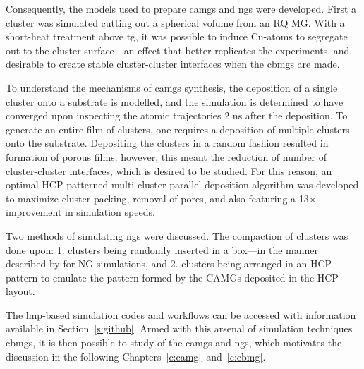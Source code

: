 Consequently, the models used to prepare \gls{camg}s and \gls{ng}s were developed. First a cluster was simulated cutting out a spherical volume from an RQ MG. With a short-heat treatment above \gls{tg}, it was possible to induce Cu-atoms to segregate out to the cluster surface---an effect that better replicates the experiments, and desirable to create stable cluster-cluster interfaces when the \gls{cbmg}s are made. \par

To understand the mechanisms of \gls{camg}s synthesis, the deposition of a single cluster onto a substrate is modelled, and the simulation is determined to have converged upon inspecting the atomic trajectories 2 ns after the deposition. To generate an entire film of clusters, one requires a deposition of multiple clusters onto the substrate. Depositing the clusters in a random fashion resulted in formation of porous films: however, this meant the reduction of number of cluster-cluster interfaces, which is desired to be studied. For this reason, an optimal HCP patterned multi-cluster parallel deposition algorithm was developed to maximize cluster-packing, removal of pores, and also featuring a 13$\times$ improvement in simulation speeds. \par

Two methods of simulating \gls{ng}s were discussed. The compaction of clusters was done upon: 1. clusters being randomly inserted in a box---in the manner described by \textcite{Adjaoud2018} for NG simulations, and 2. clusters being arranged in an HCP pattern to emulate the pattern formed by the CAMGs deposited in the HCP layout. \par

The \gls{lmp}-based simulation codes and workflows can be accessed with information available in Section~\ref{s:github}. Armed with this arsenal of simulation techniques \gls{cbmg}s, it is then possible to study of the \gls{camg}s  and \gls{ng}s, which motivates the discussion in the following Chapters~\ref{c:camg}~and~\ref{c:cbmg}. \par